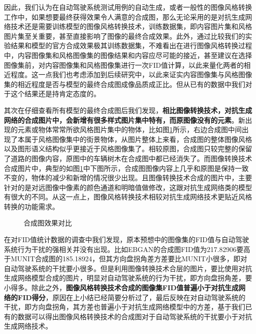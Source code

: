 因此，我们认为在自动驾驶系统测试用例的自动生成，或者一般性的图像风格转换工作中，如果想要最终获得效果令人满意的合成图，那么无论采用的是对抗生成网络技术还是需要训练模型的图像风格转换技术，训练数据集，即内容图片集和风格图片集至关重要，甚至直接影响了图像的最终合成效果。此外，通过比较我们的实验结果和模型的官方合成效果极其训练数据集，不难看出在进行图像风格转换过程中，内容图像集和风格图像集的图像结果和内容应尽可能的接近，甚至建议在选择图像集前，对内容图像集和风格图像集进行一次FID值计算，以此来量化两者的相近程度。这一点我们也考虑添加到后续研究中，以此来证实内容图像集与风格图像集的相近程度是否与模型的最终合成图成像品质成正比。但从已有的数据中我们对于这个结果还是持肯定态度的。

其次在仔细查看所有模型的最终合成图后我们发现，\textbf{相比图像转换技术，对抗生成网络的合成图片中，会新增有很多样式图片集中特有，而原图像没有的元素}。新出现的元素或物体常常所欲风格图片集中的物体，比如图\ref{fig:new}所示，右边合成图中间出现了本属于风格图像集中的街景物体，从图片整体上来看，合成图的整体图像风格以及图形语义结构似乎更接近于风格图像集了。相较原图，合成图只较完整的保留了道路的图像内容，原图中的车辆树木在合成图中都已经消失了。而图像转换技术合成图片中，典型的如图\ref{fig:new}中下图所示，合成图图像内容上几乎和原图是保持一致不变的，物体的减少和新增的情况很少出现。且图像转换技术合成的图片中，主要针对的是对远图像中像素的颜色通道和明暗值做修改，这跟对抗生成网络类的模型有很大的不同。从这一点上，图像风格转换技术相较对抗生成网络技术更贴近风格转换的功能需求。

\begin{figure}[h]
    \centering
    \caption{合成图效果对比}
    \label{fig:new}
\end{figure}

在对FID值统计数据的调查中我们发现，原本预想中的图像集的FID值与自动驾驶系统行为干扰的强相关并没有出现。比如EBGAN的合成图FID值为217.82906要高于MUNIT合成图的185.18924，但其方向盘拐角差方差要比MUNIT小很多，即对自动驾驶系统的干扰要小很多。但是利用图像转换技术合层的图片，要比使用对抗生成网络模型合成的图片，明显对自动驾驶系统的行为干扰，即方向盘拐角差，要小得多。除此之外，\textbf{图像风格转换技术合成的图像集FID值普遍小于对抗生成网络的FID得分}，原因在上小结已经简要分析过了，最后反映在对自动驾驶系统的干扰，即方向盘拐角，其方差也普遍小于对抗生成网络模型中的方差，基于我们已有的数据可以得出图像风格转换技术的合成图对于自动驾驶系统的干扰要小于对抗生成网络技术。

